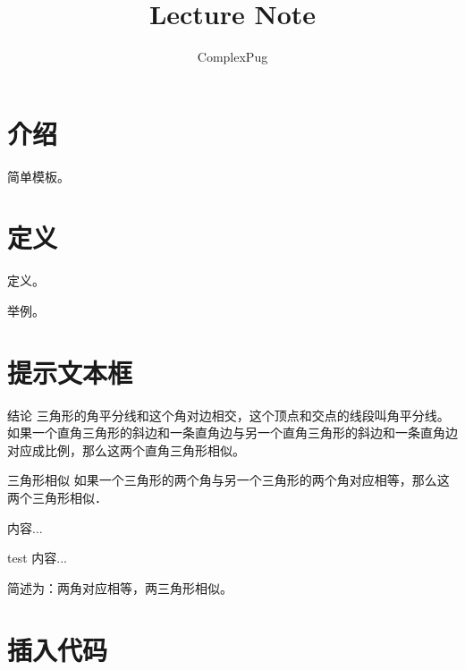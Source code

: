 \documentclass[12pt,A4paper,oneside]{ctexbook}
\title{Lecture Note}
\author{ComplexPug}
\begin{document}
	
\begin{titlepage}
   \maketitle
\end{titlepage}

\begin{titlepage}
	\tableofcontents
\end{titlepage}    

	
	
	
\section{介绍}

简单模板。
	
\section{定义}

\begin{Define}
	定义。
\end{Define}

\begin{Example}
	举例。
\end{Example}

\section{提示文本框}

\begin{mytips}[red]{结论}
    三角形的角平分线和这个角对边相交，这个顶点和交点的线段叫角平分线。
    如果一个直角三角形的斜边和一条直角边与另一个直角三角形的斜边和一条直角边对应成比例，那么这两个直角三角形相似。
\end{mytips}


\begin{mybox}{三角形相似}
如果一个三角形的两个角与另一个三角形的两个角对应相等，那么这两个三角形相似．
\begin{mybox}[red]{}
内容...
\end{mybox}
\begin{mybox}[brown]{test}
内容...
\end{mybox}
简述为：两角对应相等，两三角形相似。
\end{mybox}

\section{插入代码}
\end{document}
